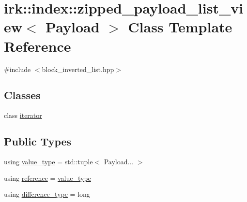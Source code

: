 \hypertarget{classirk_1_1index_1_1zipped__payload__list__view}{}\section{irk\+:\+:index\+:\+:zipped\+\_\+payload\+\_\+list\+\_\+view$<$ Payload $>$ Class Template Reference}
\label{classirk_1_1index_1_1zipped__payload__list__view}


{\ttfamily \#include $<$block\+\_\+inverted\+\_\+list.\+hpp$>$}

\subsection*{Classes}
\begin{DoxyCompactItemize}
\item 
class \mbox{\hyperlink{classirk_1_1index_1_1zipped__payload__list__view_1_1iterator}{iterator}}
\end{DoxyCompactItemize}
\subsection*{Public Types}
\begin{DoxyCompactItemize}
\item 
using \mbox{\hyperlink{classirk_1_1index_1_1zipped__payload__list__view_a5dae0163f955f3e253686927c3bd750c}{value\+\_\+type}} = std\+::tuple$<$ Payload... $>$
\item 
using \mbox{\hyperlink{classirk_1_1index_1_1zipped__payload__list__view_a63e493d2777f8c4667625cbfbfcc75f1}{reference}} = \mbox{\hyperlink{classirk_1_1index_1_1zipped__payload__list__view_a5dae0163f955f3e253686927c3bd750c}{value\+\_\+type}}
\item 
using \mbox{\hyperlink{classirk_1_1index_1_1zipped__payload__list__view_ac64dd5a88b49bb118bb780083f62907d}{difference\+\_\+type}} = long
\end{DoxyCompactItemize}
